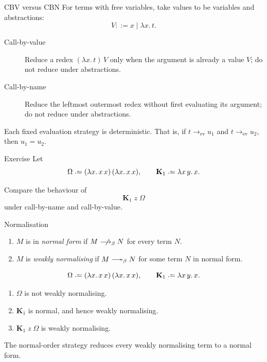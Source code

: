 \begin{frame}{CBV versus CBN}
  For terms with free variables, take values to be variables and abstractions:
  \[
    V ::= x \mid \lambda x.\,t.
  \]

  \begin{description}
    \item[Call-by-value]
      Reduce a redex $(\lambda x.\,t)\,V$ only when the argument is already
      a value $V$; do not reduce under abstractions.

    \item[Call-by-name]
      Reduce the leftmost outermost redex without first evaluating its
      argument; do not reduce under abstractions.
  \end{description}


  \begin{proposition}[Determinacy]
    Each fixed evaluation strategy is deterministic. That is, if
    $t \longrightarrow_{\mathrm{ev}} u_1$ and
    $t \longrightarrow_{\mathrm{ev}} u_2$, then $u_1 = u_2$.
  \end{proposition}
\end{frame}

\begin{frame}{Exercise}
  Let
  \[
    \Omega \defeq (\lambda x.\,x\,x)\,(\lambda x.\,x\,x),
    \qquad
    \mathbf{K}_1 \defeq \lambda x\,y.\,x.
  \]

  Compare the behaviour of
  \[
    \mathbf{K}_1\;z\;\Omega
  \]
  under call-by-name and call-by-value.
\end{frame}

\begin{frame}{Normalisation}
  \begin{definition}
    \begin{enumerate}
      \item $M$ is in \emph{normal form} if $M \notonereduce N$ for every
        term $N$.
      \item $M$ is \emph{weakly normalising} if $M \reduce N$ for some term
        $N$ in normal form.
    \end{enumerate}
  \end{definition}

  \[
    \Omega \defeq (\lambda x.\,x\,x)\,(\lambda x.\,x\,x),
    \qquad
    \mathbf{K}_1 \defeq \lambda x\,y.\,x.
  \]

  \begin{enumerate}
    \item $\Omega$ is not weakly normalising.
    \item $\mathbf{K}_1$ is normal, and hence weakly normalising.
    \item $\mathbf{K}_1\;z\;\Omega$ is weakly normalising.
  \end{enumerate}

  \begin{theorem}
    The normal-order strategy reduces every weakly normalising term to a normal
    form.
  \end{theorem}
\end{frame}

